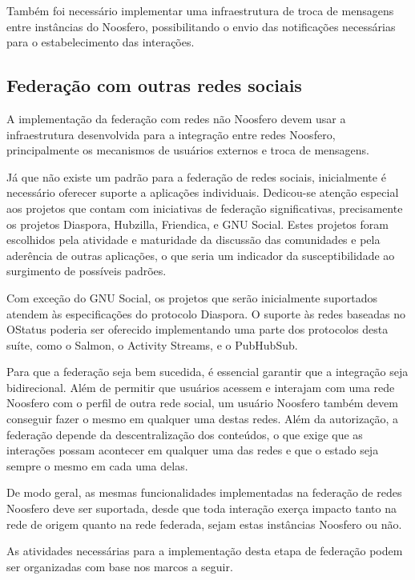 Também foi necessário implementar uma infraestrutura de troca de mensagens entre
instâncias do Noosfero, possibilitando o envio das notificações necessárias para o
estabelecimento das interações.


\subsection{Federação com outras redes sociais}

A implementação da federação com redes não Noosfero devem usar a infraestrutura
desenvolvida para a integração entre redes Noosfero, principalmente os mecanismos
de usuários externos e troca de mensagens.

Já que não existe um padrão para a federação de redes sociais, inicialmente é
necessário oferecer suporte a aplicações individuais. Dedicou-se atenção especial
aos projetos que contam com iniciativas de federação significativas, precisamente
os projetos Diaspora, Hubzilla, Friendica, e GNU Social. Estes projetos foram
escolhidos pela atividade e maturidade da discussão das comunidades e pela aderência
de outras aplicações, o que seria um indicador da susceptibilidade ao surgimento de
possíveis padrões.

Com exceção do GNU Social, os projetos que serão inicialmente suportados atendem às
especificações do protocolo Diaspora. O suporte às redes baseadas no OStatus poderia
ser oferecido implementando uma parte dos protocolos desta suíte, como o Salmon, o
Activity Streams, e o PubHubSub.

Para que a federação seja bem sucedida, é essencial garantir que a integração seja
bidirecional. Além de permitir que usuários acessem e interajam com uma rede
Noosfero com o perfil de outra rede social, um usuário Noosfero também devem
conseguir fazer o mesmo em qualquer uma destas redes. Além da autorização, a
federação depende da descentralização dos conteúdos, o que exige que as interações
possam acontecer em qualquer uma das redes e que o estado seja sempre o mesmo em
cada uma delas.

De modo geral, as mesmas funcionalidades implementadas na federação de redes
Noosfero deve ser suportada, desde que toda interação exerça impacto tanto na rede
de origem quanto na rede federada, sejam estas instâncias Noosfero ou não.

As atividades necessárias para a implementação desta etapa de federação podem ser
organizadas com base nos marcos a seguir.

